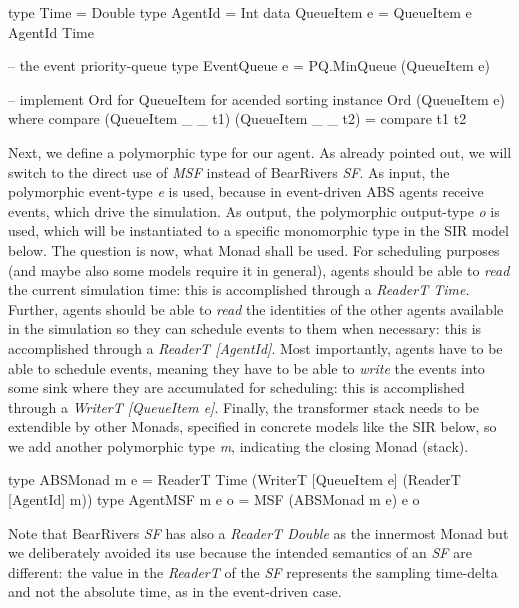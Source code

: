 \begin{HaskellCode}
type Time        = Double
type AgentId     = Int
data QueueItem e = QueueItem e AgentId Time

-- the event priority-queue
type EventQueue e = PQ.MinQueue (QueueItem e)

-- implement Ord for QueueItem for acended sorting
instance Ord (QueueItem e) where
  compare (QueueItem _ _ t1) (QueueItem _ _ t2) = compare t1 t2
\end{HaskellCode}

Next, we define a polymorphic type for our agent. As already pointed out, we will switch to the direct use of \textit{MSF} instead of BearRivers \textit{SF}. As input, the polymorphic event-type \textit{e} is used, because in event-driven ABS agents receive events, which drive the simulation. As output, the polymorphic output-type \textit{o} is used, which will be instantiated to a specific monomorphic type in the SIR model below. The question is now, what Monad shall be used. For scheduling purposes (and maybe also some models require it in general), agents should be able to \textit{read} the current simulation time: this is accomplished through a \textit{ReaderT Time}. Further, agents should be able to \textit{read} the identities of the other agents available in the simulation so they can schedule events to them when necessary: this is accomplished through a \textit{ReaderT [AgentId]}. Most importantly, agents have to be able to schedule events, meaning they have to be able to \textit{write} the events into some sink where they are accumulated for scheduling: this is accomplished through a \textit{WriterT [QueueItem e]}. Finally, the transformer stack needs to be extendible by other Monads, specified in concrete models like the SIR below, so we add another polymorphic type \textit{m}, indicating the closing Monad (stack).

\begin{HaskellCode}
type ABSMonad m e   = ReaderT Time (WriterT [QueueItem e] (ReaderT [AgentId] m))
type AgentMSF m e o = MSF (ABSMonad m e) e o
\end{HaskellCode}

Note that BearRivers \textit{SF} has also a \textit{ReaderT Double} as the innermost Monad but we deliberately avoided its use because the intended semantics of an \textit{SF} are different: the value in the \textit{ReaderT} of the \textit{SF} represents the sampling time-delta and not the absolute time, as in the event-driven case.

